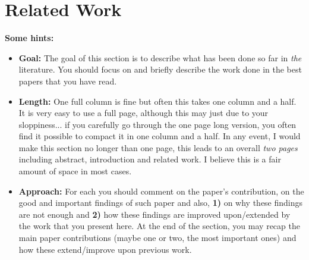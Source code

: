 
\section{Related Work}
\label{sec:related_work}

\noindent \textbf{Some hints:} 
\begin{itemize}
\item \textbf{Goal:} The goal of this section is to describe what has been done so far in {\it the} literature. You should focus on and briefly describe the work done in the best papers that you have read. 
\item \textbf{Length:} One full column is fine but often this takes one column and a half. It is very easy to use a full page, although this may just due to your sloppiness... if you carefully go through the one page long version, you often find it possible to compact it in one column and a half. In any event, I would make this section no longer than one page, this leads to an overall {\it two pages} including abstract, introduction and related work. I believe this is a fair amount of space in most cases.
\item \textbf{Approach:} For each you should comment on the paper's contribution, on the good and important findings of such paper and also, \textbf{1)} on why these findings are not enough and \textbf{2)} how these findings are improved upon/extended by the work that you present here. At the end of the section, you may recap the main paper contributions (maybe one or two, the most important ones) and how these extend/improve upon previous work.
\end{itemize}

